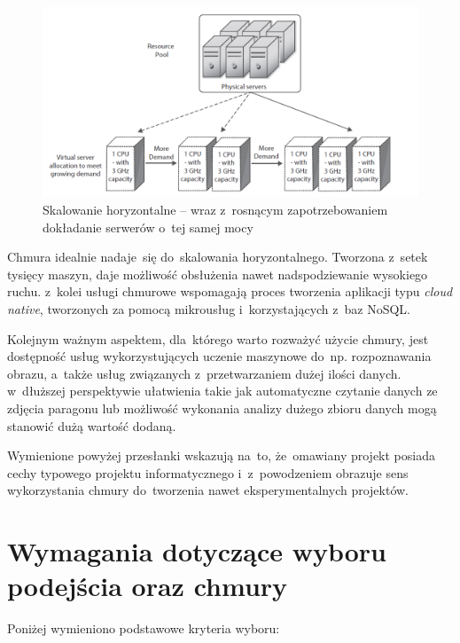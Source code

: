\documentclass[12pt,a4paper,twoside,titlepage,openright]{book}
\begin{document}
\begin{figure}[h!]
	\centering
			\includegraphics[width=\textwidth]{skalowanie-horyzontalne.png}
		\caption{Skalowanie horyzontalne -- wraz z~rosnącym zapotrzebowaniem dokładanie serwerów o~tej samej mocy \cite{ccCambridge}}
		\label{fig:skalowanie-horyzontalne}
\end{figure}

Chmura idealnie nadaje~się do~skalowania horyzontalnego. Tworzona z~setek tysięcy maszyn, daje możliwość obsłużenia nawet nadspodziewanie wysokiego ruchu. z~kolei usługi chmurowe wspomagają proces tworzenia aplikacji typu \textit{cloud native}, tworzonych za pomocą mikrousług i~korzystających z~baz NoSQL.

Kolejnym ważnym aspektem, dla~którego warto rozważyć użycie chmury, jest dostępność usług wykorzystujących uczenie maszynowe do~np. rozpoznawania obrazu, a~także usług związanych z~przetwarzaniem dużej ilości danych. w~dłuższej perspektywie ułatwienia takie jak automatyczne czytanie danych ze zdjęcia paragonu lub możliwość wykonania analizy dużego zbioru danych mogą stanowić dużą wartość dodaną.

Wymienione powyżej przesłanki wskazują na~to, że~omawiany projekt posiada cechy typowego projektu informatycznego i~z~powodzeniem obrazuje sens wykorzystania chmury do~tworzenia nawet eksperymentalnych projektów.

\section{Wymagania dotyczące wyboru podejścia oraz chmury}

Poniżej wymieniono podstawowe kryteria wyboru:
\end{document}
